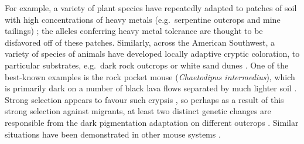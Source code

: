 \documentclass{article}
\begin{document}
For example, a variety of plant species have repeatedly adapted to patches of soil with high concentrations of heavy metals
(e.g.\ serpentine outcrops and mine tailings) \citep{turnerarabidopsis,mimulus};
the alleles conferring heavy metal tolerance are thought to be disfavored off of these patches. 
Similarly, across the American Southwest, a variety of species of animals have developed locally adaptive cryptic coloration,
to particular substrates, e.g.\ dark rock outcrops or white sand dunes \citep{benson}.
One of the best-known examples is the rock pocket mouse (\textit{Chaetodipus intermedius}),
which is primarily dark on a number of black lava flows separated by much lighter soil \citep{dice}.
Strong selection appears to favour such crypsis \citep{owls},
so perhaps as a result of this strong selection against migrants, 
at least two distinct genetic changes are responsible from the dark pigmentation adaptation on different outcrops \citep{nachman}. 
Similar situations have been demonstrated in other mouse systems \citep{beachmice,peromyscus}.








\end{document}
